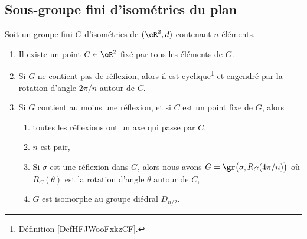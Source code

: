 \subsection{Sous-groupe fini d'isométries du plan}

\begin{theorem}       \label{THOooKDMUooUxQqbB}
	Soit un groupe fini \( G\) d'isométries de \( (\eR^2,d)\) contenant \( n \) éléments.
	\begin{enumerate}
		\item       \label{ITEMooYEONooCOMpeb}
		      Il existe un point \( C\in \eR^2\) fixé par tous les éléments de \( G\).
		\item       \label{ITEMooGELWooFFAqkc}
		      Si \( G\) ne contient pas de réflexion, alors il est cyclique\footnote{Définition \ref{DefHFJWooFxkzCF}.} et engendré par la rotation d'angle \( 2\pi/n\) autour de \( C\).
		\item       \label{ITEMooDHKEooFpCfmX}
		      Si \( G\) contient au moins une réflexion, et si \( C\) est un point fixe de \( G\), alors
		      \begin{enumerate}
			      \item       \label{ITEMooGQZTooJIPPLtyf}
			            toutes les réflexions ont un axe qui passe par \( C\),
			      \item       \label{ITEMooKPQRooLquSiQ}
			            \( n\) est pair,
			      \item       \label{ITEMooCHSWooHpDGHf}
			            Si \( \sigma\) est une réflexion dans \( G\), alors nous avons \( G=\gr\big(\sigma,R_C(4\pi/n)\big)\) où \( R_C(\theta)  \) est la rotation d'angle \( \theta\) autour de \( C\),
			      \item       \label{ITEMooROUYooRghvMv}
			            \( G\) est isomorphe au groupe diédral \( D_{n/2}\).
		      \end{enumerate}
	\end{enumerate}
\end{theorem}

